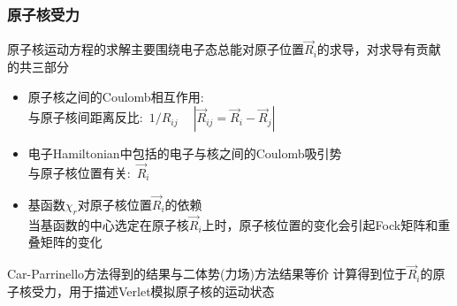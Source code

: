 %
\frame
{
	\frametitle{原子核受力}
	原子核运动方程的求解主要围绕电子态总能对原子位置$\vec R_i$的求导，对求导有贡献的共三部分
	\begin{itemize}
		\item 原子核之间的\textrm{Coulomb}相互作用:\\
			与原子核间距离反比:~$1/R_{ij}~\quad|\vec R_{ij}=\vec R_i-\vec R_j|$
		\item 电子\textrm{Hamiltonian}中包括的电子与核之间的\textrm{Coulomb}吸引势\\
			与原子核位置有关:~$\vec R_i$
		\item 基函数$\chi_r$对原子核位置$\vec R_i$的依赖\\
			当基函数的中心选定在原子核$\vec R_i$上时，原子核位置的变化会引起\textrm{Fock}矩阵和重叠矩阵的变化\\
	{\fontsize{7.2pt}{5.2pt}}
	\end{itemize}
	\textrm{Car-Parrinello}方法得到的结果与二体势(力场)方法结果等价
	\vskip 5pt
	计算得到位于$\vec R_i$的原子核受力，用于描述\textrm{Verlet}模拟原子核的运动状态
}


